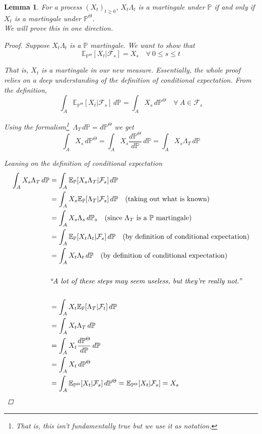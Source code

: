 \documentclass[12pt]{article}
\newtheorem{lemma}{Lemma}
\newlength\tindent
\renewcommand{\indent}{\hspace*{\tindent}}
\begin{document}
\begin{lemma} For a process $(X_t)_{t\geq0}$, $X_t\Lambda_t$ is a martingale under $\mathbb P$ if and only if $X_t$ is a martingale under $\mathbb P^\Theta$. \\

We will prove this in one direction.
\begin{proof} Suppose $X_t\Lambda_t$ is a $\mathbb P$ martingale. We want to show that
\begin{equation*}
	\mathbb E_{\mathbb P^\Theta}[X_t|\mathcal F_s] = X_s \quad \forall~0\leq s\leq t
\end{equation*}

\indent That is, $X_t$ is a martingale in our new measure. Essentially, the whole proof relies on a deep understanding of the definition of conditional expectation. From the definition,
\begin{equation*}
	\int_A \mathbb E_{\mathbb P^\Theta}[X_t|\mathcal F_s]\,d\mathbb P = \int_A X_s\,d\mathbb P^\Theta \quad \forall~A\in \mathcal F_s
\end{equation*}

Using the formalism\footnote{That is, this isn't fundamentally true but we use it as notation.}~$\Lambda_T\,d\mathbb P = d\mathbb P^\Theta$ we get
\begin{equation*}
	\int_A X_s\,d\mathbb P^\Theta = \int_A X_s \frac{d\mathbb P^\Theta}{d\mathbb P}\,d\mathbb P = \int_A X_s\Lambda_T\,d\mathbb P
\end{equation*}

Leaning on the definition of conditional expectation
\begin{align*}
	\int_A X_s\Lambda_T\,d\mathbb P &= \int_A\mathbb E_{\mathbb P}[X_s\Lambda_T|\mathcal F_s]\,d\mathbb P \\
	&= \int_A X_s \mathbb E_{\mathbb P}[\Lambda_T|\mathcal F_s]\,d\mathbb P \quad \text{(taking out what is known)} \\
	&= \int_A X_s\Lambda_s\,d\mathbb P_s \quad \text{(since $\Lambda_T$ is a $\mathbb P$ martingale)} \\
	&= \int_A \mathbb E_{\mathbb P}[X_t\Lambda_t|\mathcal F_s]\,d\mathbb P \quad \text{(by definition of conditional expectation)}\\
	&= \int_A X_t\Lambda_t\,d\mathbb P \quad \text{(by definition of conditional expectation)} \\
	\\
&\text{{\em ``A lot of these steps may seem useless, but they're really not.''}} \\
	\\
	&= \int_A X_t\mathbb E_{\mathbb P}[\Lambda_T|\mathcal F_t]\,d\mathbb P \\
	&= \int_A X_t\Lambda_T\,d\mathbb P \\
	&= \int_A X_t \frac{d\mathbb P^\Theta}{d\mathbb P}\,d\mathbb P \\
	&= \int_A X_t\,d\mathbb P^\Theta \\
	&= \int_A \mathbb E_{\mathbb P^\Theta}[X_t|\mathcal F_s]\,d\mathbb P^\Theta = \mathbb E_{\mathbb P^\Theta}[X_t|\mathcal F_s] = X_s
\end{align*}
\end{proof}
\end{lemma}
\end{document}
